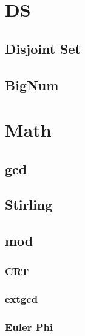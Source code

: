 \section{DS}

\subsection{Disjoint Set}


% 

\subsection{BigNum}


\section{Math}

\subsection{gcd}

\subsection{Stirling}


\subsection{mod}
\subsubsection{CRT}

\subsubsection{extgcd}

\subsubsection{Euler Phi}


